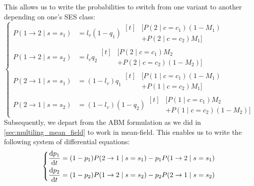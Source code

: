 \documentclass[../thesis.tex]{subfiles}
\begin{document}
This allows us to write the probabilities to switch from one variant to
another depending on one's \ac{SES} class:
\begin{equation}
  \left\{
  \begin{aligned}
      P(1 \rightarrow 2 \mid s = s_1)
          &= l_v (1 - q_1)
          \begin{aligned}[t]
            &[P(2 \mid c = c_1) (1 - M_1)
            \\
            &+ P(2 \mid c = c_2) M_1]
          \end{aligned}
      \\[1ex]
      P(1 \rightarrow 2 \mid s = s_2)
          &= l_v q_2
          \begin{aligned}[t]
              &[P(2 \mid c = c_1) M_2
              \\
              &+ P(2 \mid c = c_2)(1 - M_2)]
          \end{aligned}
      \\[1ex]
      P(2 \rightarrow 1 \mid s = s_1)
          &= (1 - l_v) q_1
          \begin{aligned}[t]
              &[P(1 \mid c = c_1) (1 - M_1)
              \\
              & + P(1 \mid c = c_2) M_1]
          \end{aligned}
      \\[1ex]
      P(2 \rightarrow 1 \mid s = s_2)
          &= (1 - l_v) (1 - q_2)
          \begin{aligned}[t]
              &[P(1 \mid c = c_1) M_2
              \\
              &+ P(1 \mid c = c_2) (1 - M_2)]
          \end{aligned}
  \end{aligned}
  \right.
\end{equation}
Subsequently, we depart from the \ac{ABM} formulation as we did in
\cref{sec:multiling_mean_field} to work in mean-field. This enables us to write the
following system of differential equations:
\begin{equation}
    \label{eq:ses_ling_time_evol}
    \left\{
    \begin{aligned}
        \dv{p_1}{t} 
            &= (1 - p_1) P(2 \rightarrow 1 \mid s = s_1)
                - p_1 P(1 \rightarrow 2 \mid s = s_1)
        \\
        \dv{p_2}{t} 
            &= (1 - p_2) P(1 \rightarrow 2 \mid s = s_2)
                 - p_2 P(2 \rightarrow 1 \mid s = s_2)
    \end{aligned}
    \right.
\end{equation}
\end{document}
